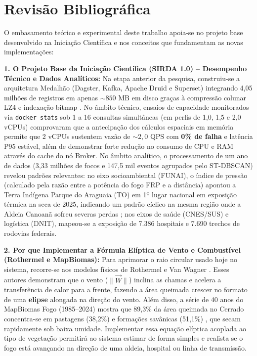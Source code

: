 \section{Revisão Bibliográfica}
\label{sc:revisao}

O embasamento teórico e experimental deste trabalho apoia-se no projeto base desenvolvido na Iniciação Científica e nos conceitos que fundamentam as novas implementações:

\textbf{1. O Projeto Base da Iniciação Científica (SIRDA 1.0) -- Desempenho Técnico e Dados Analíticos:} Na etapa anterior da pesquisa, construiu-se a arquitetura Medalhão (Dagster, Kafka, Apache Druid e Superset) integrando 4,05 milhões de registros em apenas $\sim 850\text{ MB}$ em disco graças à compressão colunar LZ4 e indexação bitmap \cite{yang2014druid}. No âmbito técnico, ensaios de capacidade monitorados via \texttt{docker stats} sob 1 a 16 consultas simultâneas (em perfis de 1,0, 1,5 e 2,0 vCPUs) comprovaram que a antecipação dos cálculos espaciais em memória permite que 2 vCPUs sustentem vazão de $\sim 2{,}0\text{ QPS}$ com \textbf{0\% de falha} e latência P95 estável, além de demonstrar forte redução no consumo de CPU e RAM através do cache do nó Broker. No âmbito analítico, o processamento de um ano de dados (3,33 milhões de focos e 147,5 mil eventos agrupados pelo ST-DBSCAN) revelou padrões relevantes: no eixo socioambiental (FUNAI), o índice de pressão (calculado pela razão entre a potência do fogo FRP e a distância) apontou a Terra Indígena Parque do Araguaia (TO) em 1º lugar nacional em exposição térmica na seca de 2025, indicando um padrão cíclico na mesma região onde a Aldeia Canoanã sofreu severas perdas \cite{g1_canoana_2026}; nos eixos de saúde (CNES/SUS) e logística (DNIT), mapeou-se a exposição de 7.386 hospitais e 7.690 trechos de rodovias federais.

\textbf{2. Por que Implementar a Fórmula Elíptica de Vento e Combustível (Rothermel e MapBiomas):} Para aprimorar o raio circular usado hoje no sistema, recorre-se aos modelos físicos de Rothermel \cite{rothermel1972mathematical} e Van Wagner \cite{vanwagner1969combined}. Esses autores demonstram que o vento ($\|\vec{W}\|$) inclina as chamas e acelera a transferência de calor para a frente, fazendo a área queimada crescer no formato de uma \textbf{elipse} alongada na direção do vento. Além disso, a série de 40 anos do MapBiomas Fogo (1985--2024) mostra que 89,3\% da área queimada no Cerrado concentra-se em pastagens (38,2\%) e formações savânicas (51,1\%) \cite{mapbiomas2026fogo}, que secam rapidamente sob baixa umidade. Implementar essa equação elíptica acoplada ao tipo de vegetação permitirá ao sistema estimar de forma simples e realista se o fogo está avançando na direção de uma aldeia, hospital ou linha de transmissão.

